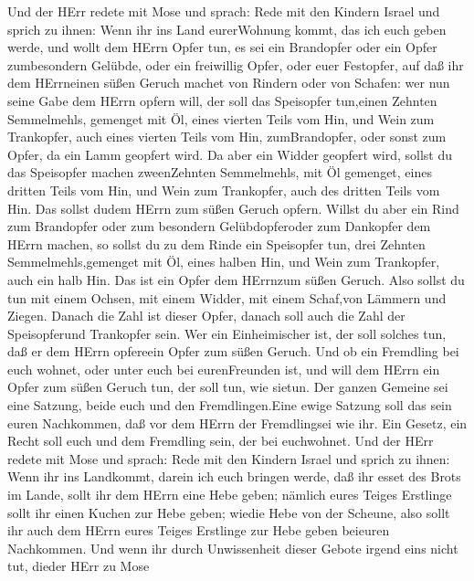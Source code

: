  Und der HErr redete mit Mose und sprach:  Rede
mit den Kindern Israel und sprich zu ihnen: Wenn ihr ins Land
eurerWohnung kommt, das ich euch geben werde,  und wollt dem
HErrn Opfer tun, es sei ein Brandopfer oder ein Opfer zumbesondern
Gelübde, oder ein freiwillig Opfer, oder euer Festopfer, auf daß ihr dem
HErrneinen süßen Geruch machet von Rindern oder von Schafen:
 wer nun seine Gabe dem HErrn opfern will, der soll das
Speisopfer tun,einen Zehnten Semmelmehls, gemenget mit Öl, eines vierten
Teils vom Hin,  und Wein zum Trankopfer, auch eines vierten
Teils vom Hin, zumBrandopfer, oder sonst zum Opfer, da ein Lamm geopfert
wird.  Da aber ein Widder geopfert wird, sollst du das
Speisopfer machen zweenZehnten Semmelmehls, mit Öl gemenget, eines
dritten Teils vom Hin,  und Wein zum Trankopfer, auch des
dritten Teils vom Hin. Das sollst dudem HErrn zum süßen Geruch opfern.
 Willst du aber ein Rind zum Brandopfer oder zum besondern
Gelübdopferoder zum Dankopfer dem HErrn machen,  so sollst
du zu dem Rinde ein Speisopfer tun, drei Zehnten Semmelmehls,gemenget
mit Öl, eines halben Hin,  und Wein zum Trankopfer, auch
ein halb Hin. Das ist ein Opfer dem HErrnzum süßen Geruch. 
Also sollst du tun mit einem Ochsen, mit einem Widder, mit einem
Schaf,von Lämmern und Ziegen.  Danach die Zahl ist dieser
Opfer, danach soll auch die Zahl der Speisopferund Trankopfer sein.
 Wer ein Einheimischer ist, der soll solches tun, daß er
dem HErrn opfereein Opfer zum süßen Geruch.  Und ob ein
Fremdling bei euch wohnet, oder unter euch bei eurenFreunden ist, und
will dem HErrn ein Opfer zum süßen Geruch tun, der soll tun, wie sietun.
 Der ganzen Gemeine sei eine Satzung, beide euch und den
Fremdlingen.Eine ewige Satzung soll das sein euren Nachkommen, daß vor
dem HErrn der Fremdlingsei wie ihr.  Ein Gesetz, ein Recht
soll euch und dem Fremdling sein, der bei euchwohnet.  Und
der HErr redete mit Mose und sprach:  Rede mit den Kindern
Israel und sprich zu ihnen: Wenn ihr ins Landkommt, darein ich euch
bringen werde,  daß ihr esset des Brots im Lande, sollt ihr
dem HErrn eine Hebe geben;  nämlich eures Teiges Erstlinge
sollt ihr einen Kuchen zur Hebe geben; wiedie Hebe von der Scheune,
 also sollt ihr auch dem HErrn eures Teiges Erstlinge zur
Hebe geben beieuren Nachkommen.  Und wenn ihr durch
Unwissenheit dieser Gebote irgend eins nicht tut, dieder HErr zu Mose

